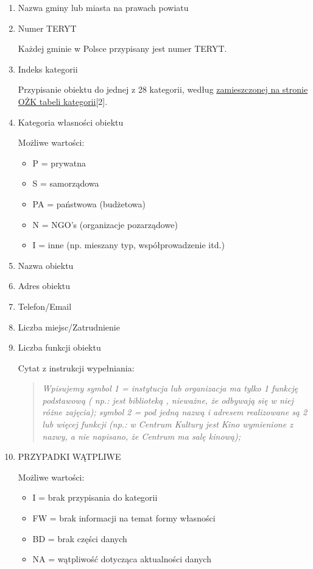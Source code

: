 \documentclass[a4 122pt]{article}
\begin{document}
			\begin{enumerate}
				\item{Nazwa gminy lub miasta na prawach powiatu}
				\item{Numer TERYT}
				
					Każdej gminie w Polsce przypisany jest numer TERYT. 
					
				\item{Indeks kategorii}
				
					Przypisanie obiektu do jednej z 28 kategorii, według \href{http://ozkultura.pl/node/1800}{zamieszczonej na stronie OŻK tabeli kategorii}[2].
					
				\item{Kategoria własności obiektu}
					
					Możliwe wartości:
					\begin{itemize}
						\item P = prywatna
						\item S = samorządowa
						\item PA = państwowa (budżetowa)
						\item N = NGO's (organizacje pozarządowe)
						\item I = inne (np. mieszany typ, współprowadzenie itd.)
					\end{itemize}
					
				\item{Nazwa obiektu}
				\item{Adres obiektu}
				\item{Telefon/Email}
				\item{Liczba miejsc/Zatrudnienie}
				\item{Liczba funkcji obiektu}
				
					Cytat z instrukcji wypełniania:
					
					\begin{quote}
					\textit{Wpisujemy symbol 1 = instytucja lub organizacja ma tylko 1 funkcję podstawową ( np.: jest biblioteką , nieważne, że odbywają się w niej różne zajęcia); symbol 2 = pod jedną nazwą i adresem realizowane są 2 lub więcej funkcji (np.: w Centrum Kultury jest Kino wymienione z nazwy, a nie napisano, że Centrum ma salę kinową);}
					\end{quote}
				
				\item{PRZYPADKI WĄTPLIWE}
				
					Możliwe wartości:
					\begin{itemize}
						\item I = brak przypisania do kategorii
						\item FW = brak informacji na temat formy własności
						\item BD = brak części danych
						\item NA = wątpliwość dotycząca aktualności danych
					\end{itemize}
					
			\end{enumerate}
	
\end{document}
